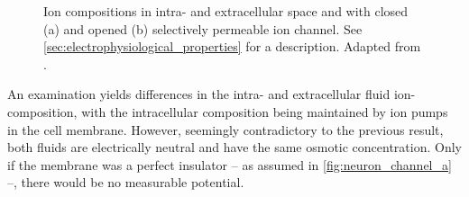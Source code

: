 \begin{figure}
	\centering
	\caption[Membrane potential change caused by selectively permeable ion channel]{Ion compositions in intra- and extracellular space and with closed (a) and opened (b) selectively permeable ion channel. See \cref{sec:electrophysiological_properties} for a description. Adapted from \cite{kandel2012principles}.}
\end{figure}
An examination yields differences in the intra- and extracellular fluid ion-composition, with the intracellular composition being maintained by ion pumps in the cell membrane. However, seemingly contradictory to the previous result, both fluids are electrically neutral and have the same osmotic concentration. Only if the membrane was a perfect insulator -- as assumed in \cref{fig:neuron_channel_a} --, there would be no measurable potential.

